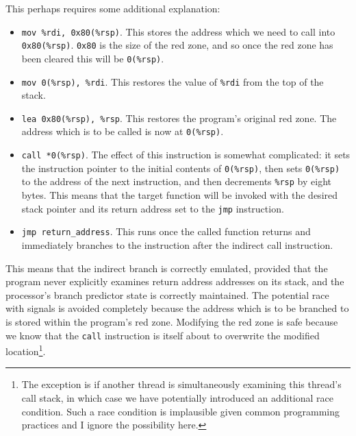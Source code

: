 
This perhaps requires some additional explanation:

\begin{itemize}
\item \verb|mov %rdi, 0x80(%rsp)|.  This stores the address which we
  need to call into \verb|0x80(%rsp)|.  \verb|0x80| is the size of the
  red zone, and so once the red zone has been cleared this will be
  \verb|0(%rsp)|.
\item \verb|mov 0(%rsp), %rdi|.  This restores the value of
  \verb|%rdi| from the top of the stack.
\item \verb|lea 0x80(%rsp), %rsp|.  This restores the program's
  original red zone.  The address which is to be called is now at
  \verb|0(%rsp)|.
\item \verb|call *0(%rsp)|.  The effect of this instruction is
  somewhat complicated: it sets the instruction pointer to the initial
  contents of \verb|0(%rsp)|, then sets \verb|0(%rsp)| to the address
  of the next instruction, and then decrements \verb|%rsp| by eight
  bytes.  This means that the target function will be invoked with the
  desired stack pointer and its return address set to the \verb|jmp|
  instruction.
\item \verb|jmp return_address|.  This runs once the called function
  returns and immediately branches to the instruction after the
  indirect call instruction.
\end{itemize}

This means that the indirect branch is correctly emulated, provided
that the program never explicitly examines return address addresses on
its stack, and the processor's branch predictor state is correctly
maintained.  The potential race with signals is avoided completely
because the address which is to be branched to is stored within the
program's red zone.  Modifying the red zone is safe because we know
that the \verb|call| instruction is itself about to overwrite the
modified location\footnote{The exception is if another thread is
  simultaneously examining this thread's call stack, in which case we
  have potentially introduced an additional race condition.  Such a
  race condition is implausible given common programming practices and
  I ignore the possibility here.}.

